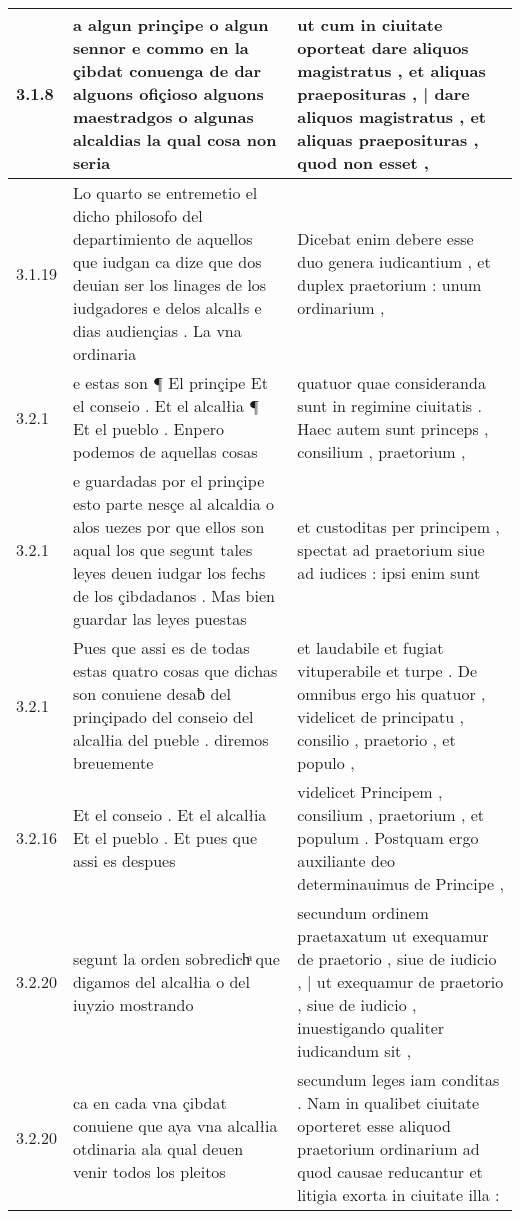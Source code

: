 \begin{tabular}{|p{1cm}|p{6.5cm}|p{6.5cm}|}

\hline
3.1.8 & a algun prinçipe o algun sennor e commo en la çibdat conuenga de dar alguons ofiçioso alguons maestradgos o algunas alcaldias la qual cosa non seria & ut cum in ciuitate oporteat dare aliquos magistratus , et aliquas praeposituras , | dare aliquos magistratus , et aliquas praeposituras , quod non esset , \\\hline
3.1.19 & Lo quarto se entremetio el dicho philosofo del departimiento de aquellos que iudgan ca dize que dos deuian ser los linages de los iudgadores e delos alcalłs e dias audiençias . La vna ordinaria & Dicebat enim debere esse duo genera iudicantium , et duplex praetorium : unum ordinarium , \\\hline
3.2.1 & e estas son ¶ El prinçipe Et el conseio . Et el alcalłia ¶ Et el pueblo . Enpero podemos de aquellas cosas & quatuor quae consideranda sunt in regimine ciuitatis . Haec autem sunt princeps , consilium , praetorium , \\\hline
3.2.1 & e guardadas por el prinçipe esto parte nesçe al alcaldia o alos uezes por que ellos son aqual los que segunt tales leyes deuen iudgar los fechs de los çibdadanos . Mas bien guardar las leyes puestas & et custoditas per principem , spectat ad praetorium siue ad iudices : ipsi enim sunt \\\hline
3.2.1 & Pues que assi es de todas estas quatro cosas que dichas son conuiene desaƀ del prinçipado del conseio del alcalłia del pueble . diremos breuemente & et laudabile et fugiat vituperabile et turpe . De omnibus ergo his quatuor , videlicet de principatu , consilio , praetorio , et populo , \\\hline
3.2.16 & Et el conseio . Et el alcalłia Et el pueblo . Et pues que assi es despues & videlicet Principem , consilium , praetorium , et populum . Postquam ergo auxiliante deo determinauimus de Principe , \\\hline
3.2.20 & segunt la orden sobredichͣ que digamos del alcalłia o del iuyzio mostrando & secundum ordinem praetaxatum ut exequamur de praetorio , siue de iudicio , | ut exequamur de praetorio , siue de iudicio , inuestigando qualiter iudicandum sit , \\\hline
3.2.20 & ca en cada vna çibdat conuiene que aya vna alcalłia otdinaria ala qual deuen venir todos los pleitos & secundum leges iam conditas . Nam in qualibet ciuitate oporteret esse aliquod praetorium ordinarium ad quod causae reducantur et litigia exorta in ciuitate illa : \\\hline

\end{tabular}
